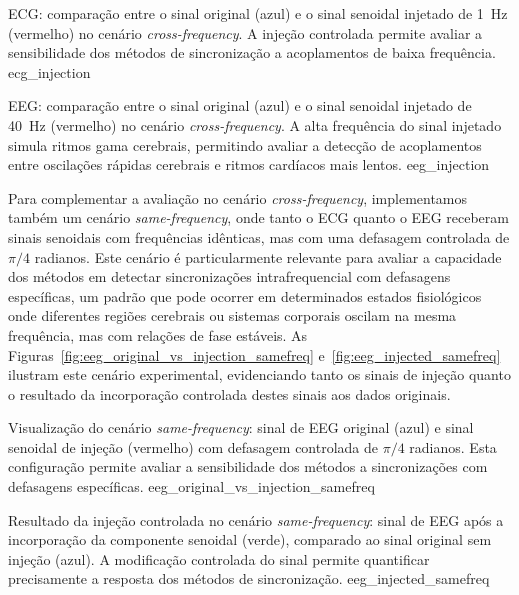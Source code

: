 {ECG: comparação entre o sinal original (azul) e o sinal senoidal injetado de 1~Hz (vermelho) no cenário \textit{cross-frequency}. A injeção controlada permite avaliar a sensibilidade dos métodos de sincronização a acoplamentos de baixa frequência.}
{ecg_injection}

{EEG: comparação entre o sinal original (azul) e o sinal senoidal injetado de 40~Hz (vermelho) no cenário \textit{cross-frequency}. A alta frequência do sinal injetado simula ritmos gama cerebrais, permitindo avaliar a detecção de acoplamentos entre oscilações rápidas cerebrais e ritmos cardíacos mais lentos.}
{eeg_injection}

Para complementar a avaliação no cenário \textit{cross-frequency}, implementamos também um cenário \textit{same-frequency}, onde tanto o ECG quanto o EEG receberam sinais senoidais com frequências idênticas, mas com uma defasagem controlada de \(\pi/4\) radianos. Este cenário é particularmente relevante para avaliar a capacidade dos métodos em detectar sincronizações intrafrequencial com defasagens específicas, um padrão que pode ocorrer em determinados estados fisiológicos onde diferentes regiões cerebrais ou sistemas corporais oscilam na mesma frequência, mas com relações de fase estáveis. As Figuras~\ref{fig:eeg_original_vs_injection_samefreq} e~\ref{fig:eeg_injected_samefreq} ilustram este cenário experimental, evidenciando tanto os sinais de injeção quanto o resultado da incorporação controlada destes sinais aos dados originais.

{Visualização do cenário \textit{same-frequency}: sinal de EEG original (azul) e sinal senoidal de injeção (vermelho) com defasagem controlada de \(\pi/4\) radianos. Esta configuração permite avaliar a sensibilidade dos métodos a sincronizações com defasagens específicas.}
{eeg_original_vs_injection_samefreq}

{Resultado da injeção controlada no cenário \textit{same-frequency}: sinal de EEG após a incorporação da componente senoidal (verde), comparado ao sinal original sem injeção (azul). A modificação controlada do sinal permite quantificar precisamente a resposta dos métodos de sincronização.}
{eeg_injected_samefreq}

